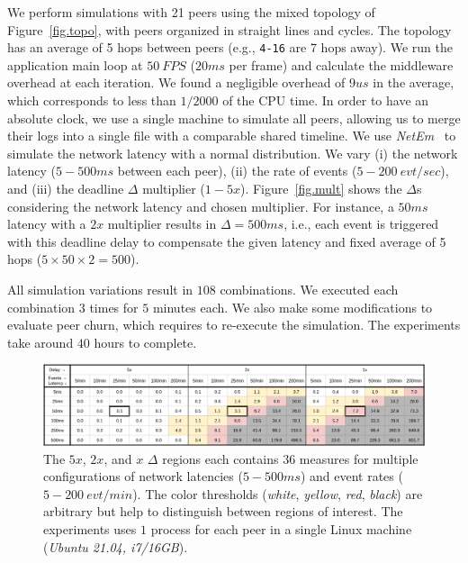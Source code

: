 \documentclass[sn-mathphys,iicol]{sn-jnl}%
\newcommand{\code}[1]  {\texttt{\small{#1}}}
\begin{document}
We perform simulations with 21 peers using the mixed topology of
Figure~\ref{fig.topo}, with peers organized in straight lines and cycles.
The topology has an average of 5 hops between peers (e.g., \code{4-16} are 7
hops away).
%
We run the application main loop at $50~FPS$ ($20ms$ per frame) and calculate
the middleware overhead at each iteration.
We found a negligible overhead of $9us$ in the average, which corresponds to
less than $1/2000$ of the CPU time.
%
In order to have an absolute clock, we use a single machine to simulate all
peers, allowing us to merge their logs into a single file with a comparable
shared timeline.
%
We use \emph{NetEm}~\cite{netem} to simulate the network latency with a normal
distribution.
%
We vary
    (i)   the network latency ($5-500ms$ between each peer),
    (ii)  the rate of events ($5-200~evt/sec$), and
    (iii) the deadline $\Delta$ multiplier ($1-5x$).
%
Figure~\ref{fig.mult} shows the $\Delta$s considering the network latency and
chosen multiplier.
For instance, a $50ms$ latency with a $2x$ multiplier results in
$\Delta=500ms$, i.e., each event is triggered with this deadline delay to
compensate the given latency and fixed average of 5 hops
($5 \times 50 \times 2 = 500$).

All simulation variations result in $108$ combinations.
We executed each combination $3$ times for $5$ minutes each.
We also make some modifications to evaluate peer churn, which requires to
re-execute the simulation.
The experiments take around $40$ hours to complete.


\begin{figure}
  \centering
  \includegraphics[width=\linewidth]{baks}
  \caption{
    \label{fig.baks}
The $5x$, $2x$, and $x$ $\Delta$ regions each contains $36$ measures for
multiple configurations of network latencies ($5-500ms$) and event rates
($5-200~evt/min$).
%
The color thresholds (\emph{white}, \emph{yellow}, \emph{red}, \emph{black})
are arbitrary but help to distinguish between regions of interest.
%
The experiments uses $1$ process for each peer in a single Linux machine
(\emph{Ubuntu 21.04, i7/16GB}).
    }
\end{figure}
\end{document}
